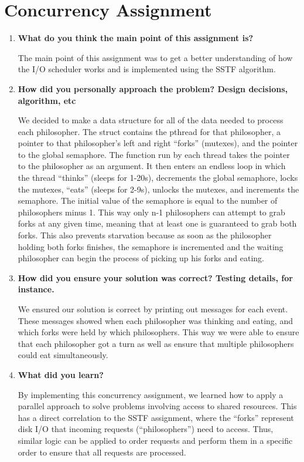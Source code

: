 {\bf }\documentclass[letterpaper,10pt,titlepage,draftclsnofoot,onecolumn]{IEEEtran}
\begin{document}
\section{Concurrency Assignment}
\begin{enumerate}
\item \textbf{What do you think the main point of this assignment is?}

The main point of this assignment was to get a better understanding of how the I/O scheduler works and is implemented using the SSTF algorithm. \par

\item \textbf{How did you personally approach the problem? Design decisions, algorithm, etc}

We decided to make a data structure for all of the data needed to process each philosopher. The struct contains the pthread for that philosopher, a pointer to that philosopher's left and right ``forks'' (mutexes), and the pointer to the global semaphore. The function run by each thread takes the pointer to the philosopher as an argument. It then enters an endless loop in which the thread ``thinks'' (sleeps for 1-20s), decrements the global semaphore, locks the mutexes, ``eats'' (sleeps for 2-9s), unlocks the mutexes, and increments the semaphore. The initial value of the semaphore is equal to the number of philosophers minus 1. This way only n-1 philosophers can attempt to grab forks at any given time, meaning that at least one is guaranteed to grab both forks. This also prevents starvation because as soon as the philosopher holding both forks finishes, the semaphore is incremented and the waiting philosopher can begin the process of picking up his forks and eating.

\item \textbf{How did you ensure your solution was correct? Testing details, for instance.}

We ensured our solution is correct by printing out messages for each event. These messages showed when each philosopher was thinking and eating, and which forks were held by which philosophers. This way we were able to ensure that each philosopher got a turn as well as ensure that multiple philosophers could eat simultaneously.

\item \textbf{What did you learn?}

By implementing this concurrency assignment, we learned how to apply a parallel approach to solve problems involving access to shared resources. This has a direct correlation to the SSTF assignment, where the ``forks'' represent disk I/O that incoming requests (``philosophers'') need to access. Thus, similar logic can be applied to order requests and perform them in a specific order to ensure that all requests are processed.

\end{enumerate}

\nocite{*}



\end{document}
